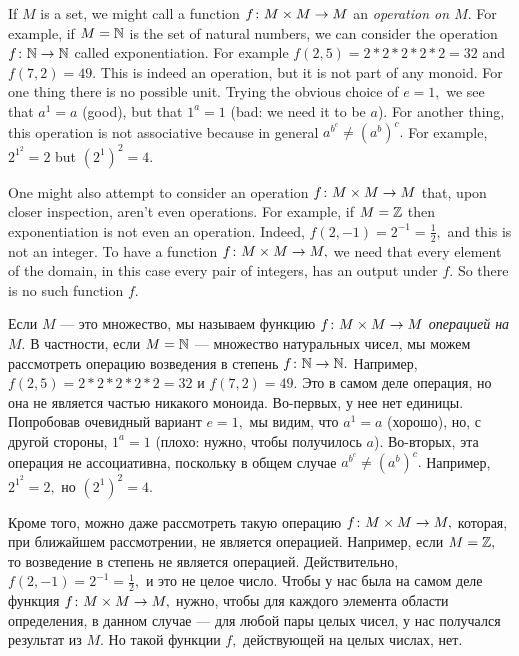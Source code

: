 \documentclass[../main/CT4S-EN-RU]{subfiles}
\begin{document}
\begin{exampleENG}
If $M$ is a set, we might call a function $f\colon M\times M\rightarrow M$ an {\em operation on $M$}. For example, if $M={\mathbb N}$ is the set of natural numbers, we can consider the operation $f\colon{\mathbb N}\rightarrow{\mathbb N}$ called exponentiation. For example $f(2,5)=2*2*2*2*2=32$ and $f(7,2)=49.$ This is indeed an operation, but it is not part of any monoid. For one thing there is no possible unit. Trying the obvious choice of $e=1,$ we see that $a^1=a$ (good), but that $1^a=1$ (bad: we need it to be $a$). For another thing, this operation is not associative because in general $a^{b^c}\neq (a^b)^c.$ For example, $2^{1^2}=2$ but $(2^1)^2=4.$

One might also attempt to consider an operation $f\colon M\times M\rightarrow M$ that, upon closer inspection, aren't even operations. For example, if $M={\mathbb Z}$ then exponentiation is not even an operation. Indeed, $f(2,-1)=2^{-1}=\frac{1}{2},$ and this is not an integer. To have a function $f\colon M\times M\rightarrow M,$ we need that every element of the domain, in this case every pair of integers, has an output under $f.$ So there is no such function $f.$
\end{exampleENG}

\begin{exampleRUS}[Не моноид]
Если $M$ — это множество, мы называем функцию $f\colon M\times M\rightarrow M$ {\em операцией на $M$}. В частности, если $M={\mathbb N}$ — множество натуральных чисел, мы можем рассмотреть операцию возведения в степень $f\colon{\mathbb N}\rightarrow{\mathbb N}.$ Например, $f(2,5)=2*2*2*2*2=32$ и $f(7,2)=49.$ Это в самом деле операция, но она не является частью никакого моноида. Во-первых, у нее нет единицы. Попробовав очевидный вариант $e=1,$ мы видим, что $a^1=a$ (хорошо), но, с другой стороны, $1^a=1$ (плохо: нужно, чтобы получилось $a$). Во-вторых, эта операция не ассоциативна, поскольку в общем случае $a^{b^c}\neq (a^b)^c.$ Например, $2^{1^2}=2,$ но $(2^1)^2=4.$

Кроме того, можно даже рассмотреть такую операцию $f\colon M\times M\rightarrow M,$ которая, при ближайшем рассмотрении, не является операцией. Например, если $M={\mathbb Z},$ то возведение в степень не является операцией. Действительно, $f(2,-1)=2^{-1}=\frac{1}{2},$ и это не целое число. Чтобы у нас была на самом деле функция $f\colon M\times M\rightarrow M,$ нужно, чтобы для каждого элемента области определения, в данном случае — для любой пары целых чисел, у нас получался результат из $M.$ Но такой функции $f,$ действующей на целых числах, нет.
\end{exampleRUS}
\end{document}
